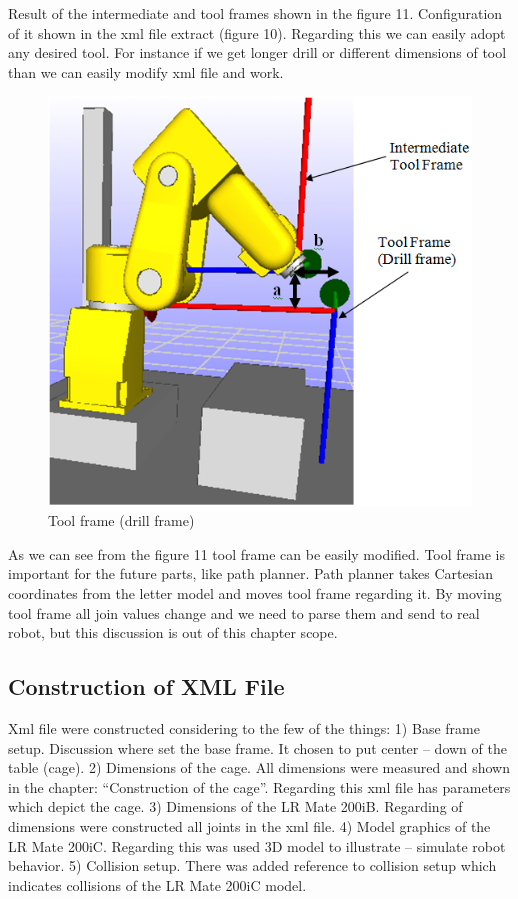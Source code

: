 Result of the intermediate and tool frames shown in the figure 11. Configuration of it shown in the xml file extract (figure 10). Regarding this we can easily adopt any desired tool. For instance if we get longer drill or different dimensions of tool than we can easily modify xml file and work.

\begin{figure}[H]
  \centering
  \includegraphics[scale= 0.6]{source/toolFrame.png}
  \caption{Tool frame (drill frame)}
  \label{fig:toolFrame}
\end{figure}

As we can see from the figure 11 tool frame can be easily modified. Tool frame is important for the future parts, like path planner. Path planner takes Cartesian coordinates from the letter model and moves tool frame regarding it. By moving tool frame all join values change and we need to parse them and send to real robot, but this discussion is out of this chapter scope.

\subsection{Construction of XML File}

Xml file were constructed considering to the few of the things:
1)	Base frame setup. Discussion where set the base frame. It chosen to put center – down of the table (cage).
2)	Dimensions of the cage. All dimensions were measured and shown in the chapter: “Construction of the cage”. Regarding this xml file has parameters which depict the cage.
3)	Dimensions of the LR Mate 200iB. Regarding of dimensions were constructed all joints in the xml file.
4)	Model graphics of the LR Mate 200iC. Regarding this was used 3D model to illustrate – simulate robot behavior.
5)	Collision setup. There was added reference to collision setup which indicates collisions of the LR Mate 200iC model.

